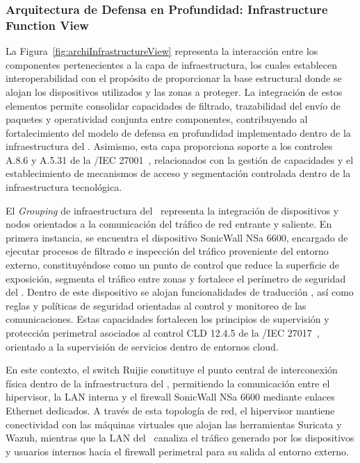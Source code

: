 \subsubsection{Arquitectura de Defensa en Profundidad: Infrastructure Function View}
\noindent
La Figura~\ref{fig:archiInfrastructureView} representa la interacción entre los componentes pertenecientes a la capa de infraestructura, los cuales establecen 
interoperabilidad con el propósito de proporcionar la base estructural donde se alojan los dispositivos utilizados y las zonas a proteger. 
La integración de estos elementos permite consolidar capacidades de filtrado, trazabilidad del envío de paquetes y operatividad conjunta 
entre componentes, contribuyendo al fortalecimiento del modelo de defensa en profundidad implementado dentro de la infraestructura del 
\GRID. Asimismo, esta capa proporciona soporte a los controles A.8.6 y A.5.31 de la \ISO/IEC 27001~\cite{iso27001}, relacionados con la 
gestión de capacidades y el establecimiento de mecanismos de acceso y segmentación controlada dentro de la infraestructura tecnológica.

El \textit{Grouping} de infraestructura del \GRID\ representa la integración de dispositivos y nodos orientados a la comunicación del 
tráfico de red entrante y saliente. En primera instancia, se encuentra el dispositivo SonicWall NSa 6600, encargado de ejecutar procesos 
de filtrado e inspección del tráfico proveniente del entorno externo, constituyéndose como un punto de control que reduce la superficie de 
exposición, segmenta el tráfico entre zonas y fortalece el perímetro de seguridad del \GRID. Dentro de este dispositivo se alojan 
funcionalidades de traducción \NAT, así como reglas y políticas de seguridad orientadas al control y monitoreo de las comunicaciones. 
Estas capacidades fortalecen los principios de supervisión y protección perimetral asociados al control CLD 12.4.5 de la \ISO/IEC 
27017~\cite{iso27017}, orientado a la supervisión de servicios dentro de entornos cloud.

En este contexto, el switch Ruijie constituye el punto central de interconexión física dentro de la infraestructura del \GRID, permitiendo 
la comunicación entre el hipervisor, la LAN interna y el firewall SonicWall NSa 6600 mediante enlaces Ethernet dedicados. A través de esta 
topología de red, el hipervisor mantiene conectividad con las máquinas virtuales que alojan las herramientas Suricata y Wazuh, mientras 
que la LAN del \GRID\ canaliza el tráfico generado por los dispositivos y usuarios internos hacia el firewall perimetral para su salida al 
entorno externo.

